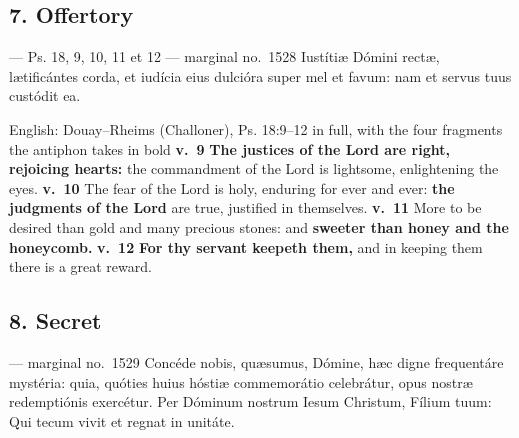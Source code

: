\elementguard
\subsection*{7. Offertory }

\begin{appointedlatin}{ --- Ps. 18, 9, 10, 11 et 12 --- marginal no.\ 1528}
Iustítiæ Dómini rectæ, lætificántes corda, et iudícia eius dulcióra super mel
et favum: nam et servus tuus custódit ea.
\end{appointedlatin}

\begin{namedtranslation}{English: Douay--Rheims (Challoner), Ps. 18:9--12 in full, with the four fragments the antiphon takes in bold}
\textbf{v.~9} \textbf{The justices of the Lord are right, rejoicing hearts:}
the commandment of the Lord is lightsome, enlightening the eyes.
\textbf{v.~10} The fear of the Lord is holy, enduring for ever and ever:
\textbf{the judgments of the Lord} are true, justified in themselves.
\textbf{v.~11} More to be desired than gold and many precious stones: and
\textbf{sweeter than honey and the honeycomb.} \textbf{v.~12} \textbf{For thy
servant keepeth them,} and in keeping them there is a great reward.
\end{namedtranslation}


\elementguard
\subsection*{8. Secret }

\begin{appointedlatin}{ --- marginal no.\ 1529}
Concéde nobis, quæsumus, Dómine, hæc digne frequentáre mystéria: quia,
quóties huius hóstiæ commemorátio celebrátur, opus nostræ redemptiónis
exercétur. Per Dóminum nostrum Iesum Christum, Fílium tuum: Qui tecum vivit et
regnat in unitáte.
\end{appointedlatin}

